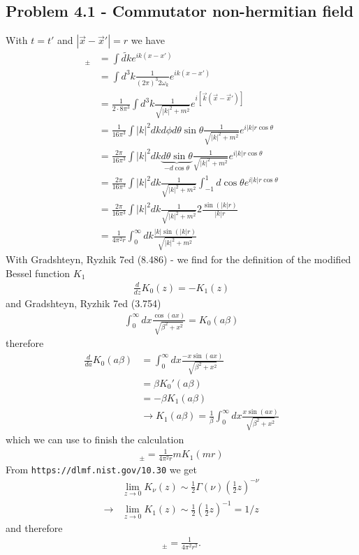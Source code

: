 \documentclass[10pt,a4paper]{book}
\theoremstyle{definition}
\begin{document}
\subsection{Problem 4.1 - Commutator non-hermitian field}
With $t=t'$ and $|\vec{x}-\vec{x}'|=r$ we have 
\begin{align}
[\varphi^+(x),\varphi^-(x')]_\pm
&=\int\widetilde{dk}e^{ik(x-x')}\\
&=\int d^3k\frac{1}{(2\pi)^3 2\omega_k}e^{ik(x-x')}\\
&=\frac{1}{2\cdot8\pi^3}\int d^3k\frac{1}{\sqrt{|k|^2+m^2}}e^{i[\vec{k}(\vec{x}-\vec{x}')]}\\
&=\frac{1}{16\pi^3}\int |k|^2dkd\phi d\theta\sin\theta\frac{1}{\sqrt{|k|^2+m^2}}e^{i|k|r\cos\theta}\\
&=\frac{2\pi}{16\pi^3}\int |k|^2dk \underbrace{d\theta\sin\theta}_{-d\cos\theta}\frac{1}{\sqrt{|k|^2+m^2}}e^{i|k|r\cos\theta}\\
&=\frac{2\pi}{16\pi^3}\int |k|^2dk \frac{1}{\sqrt{|k|^2+m^2}}\int_{-1}^1d\cos\theta e^{i|k|r\cos\theta}\\
&=\frac{2\pi}{16\pi^3}\int |k|^2dk \frac{1}{\sqrt{|k|^2+m^2}}2\frac{\sin(|k|r)}{|k|r}\\
&=\frac{1}{4\pi^2r}\int_0^\infty dk \frac{|k|\sin(|k|r)}{\sqrt{|k|^2+m^2}}
\end{align}
With Gradshteyn, Ryzhik 7ed (8.486) - we find for the definition of the modified Bessel function $K_1$ 
\begin{align}
\frac{d}{dz}K_0(z)=-K_1(z)
\end{align}
and Gradshteyn, Ryzhik 7ed (3.754)
\begin{align}
\int_0^\infty dx \frac{\cos(ax)}{\sqrt{\beta^2+x^2}}=K_0(a\beta)
\end{align}
therefore
\begin{align}
\frac{d}{da}K_0(a\beta)&=\int_0^\infty dx \frac{-x\sin(ax)}{\sqrt{\beta^2+x^2}}\\
&=\beta K_0'(a\beta)\\
&=-\beta K_1(a\beta)\\
&\rightarrow K_1(a\beta)=\frac{1}{\beta}\int_0^\infty dx \frac{x\sin(ax)}{\sqrt{\beta^2+x^2}}
\end{align}
which we can use to finish the calculation
\begin{align}
[\varphi^+(x),\varphi^-(x')]_\pm=\frac{1}{4\pi^2r}mK_1(mr)
\end{align}
From \texttt{https://dlmf.nist.gov/10.30} we get
\begin{align}
&\lim_{z\rightarrow0}K_\nu(z)\sim\frac{1}{2}\Gamma(\nu)\left(\frac{1}{2}z\right)^{-\nu}\\
\rightarrow&\lim_{z\rightarrow0}K_1(z)\sim\frac{1}{2}\left(\frac{1}{2}z\right)^{-1}=1/z
\end{align}
and therefore
\begin{align}
[\varphi^+(x),\varphi^-(x')]_\pm=\frac{1}{4\pi^2r^2}.
\end{align}
\end{document}
